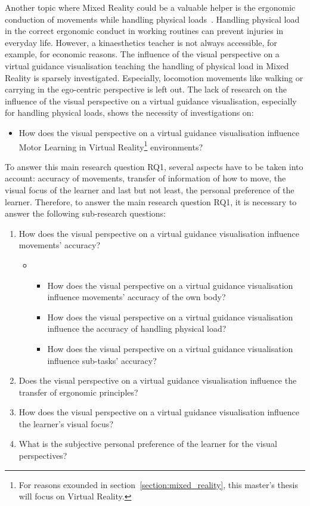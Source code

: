 Another topic where Mixed Reality could be a valuable helper is the ergonomic conduction of movements while handling physical loads~\cite{nursecare,kitt}. Handling physical load in the correct ergonomic conduct in working routines can prevent injuries in everyday life. However, a kinaesthetics teacher is not always accessible, for example, for economic reasons. The influence of the visual perspective on a virtual guidance visualisation teaching the handling of physical load in Mixed Reality is sparsely investigated. Especially, locomotion movements like walking or carrying in the ego-centric perspective is left out. The lack of research on the influence of the visual perspective on a virtual guidance visualisation, especially for handling physical loads, shows the necessity of investigations on:
\begin{itemize}
	\item[RQ1:] How does the visual perspective on a virtual guidance visualisation influence Motor Learning in Virtual Reality\footnote{For reasons exounded in section~\ref{section:mixed_reality}, this master's thesis will focus on Virtual Reality.} environments?
\end{itemize}
To answer this main research question RQ1, several aspects have to be taken into account: accuracy of movements, transfer of information of how to move, the visual focus of the learner and last but not least, the personal preference of the learner. Therefore, to answer the main research question RQ1, it is necessary to answer the following sub-research questions:
\begin{enumerate}[align=left, leftmargin=0pt, labelindent=\parindent,
	listparindent=\parindent, labelwidth=0pt, itemindent=!]
	\item[RQ1.1] How does the visual perspective on a virtual guidance visualisation influence movements' accuracy?
	\begin{itemize}
		\item[] \begin{itemize}
			\item[RQ1.1.1] How does the visual perspective on a virtual guidance visualisation influence movements' accuracy of the own body?
			\item[RQ1.1.2] How does the visual perspective on a virtual guidance visualisation influence the accuracy of handling physical load?
			\item[RQ1.1.3] How does the visual perspective on a virtual guidance visualisation influence sub-tasks' accuracy?
		\end{itemize}
	\end{itemize}
	
	\item[RQ1.2] Does the visual perspective on a virtual guidance visualisation influence the transfer of ergonomic principles?
	\item[RQ1.3] How does the visual perspective on a virtual guidance visualisation influence the learner's visual focus?
	\item[RQ1.4] What is the subjective personal preference of the learner for the visual perspectives?
\end{enumerate}
